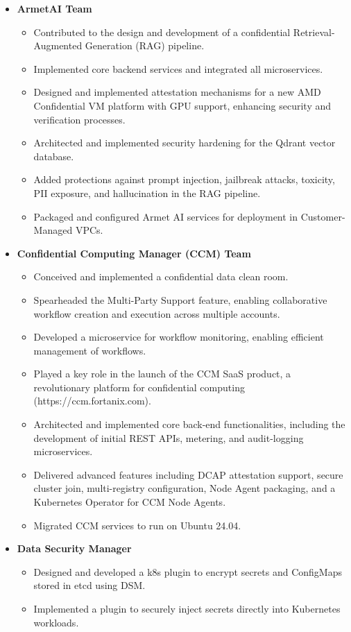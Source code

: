 \documentclass[12pt,a4paper]{article}
\begin{document}
\begin{itemize}[left=0em, label=]
\begin{itemize}[left=0.5em, label=\textbullet, leftmargin=*]
    \item  \textbf{ArmetAI Team}
    \begin{itemize}[leftmargin=*]
    \item Contributed to the design and development of a confidential Retrieval-Augmented Generation (RAG) pipeline.
    \item Implemented core backend services and integrated all microservices.
    \item Designed and implemented attestation mechanisms for a new AMD Confidential VM platform with GPU support, enhancing security and verification processes.
    \item Architected and implemented security hardening for the Qdrant vector database.
    \item Added protections against prompt injection, jailbreak attacks, toxicity, PII exposure, and hallucination in the RAG pipeline.
    \item Packaged and configured Armet AI services for deployment in Customer-Managed VPCs.
    \end{itemize}

    \item \textbf{Confidential Computing Manager (CCM) Team}
    \begin{itemize}[leftmargin=*]
    \item Conceived and implemented a confidential data clean room.
    \item Spearheaded the Multi-Party Support feature, enabling collaborative workflow creation and execution across multiple accounts.
    \item Developed a microservice for workflow monitoring, enabling efficient management of workflows.
    \item Played a key role in the launch of the CCM SaaS product, a revolutionary platform for confidential computing (https://ccm.fortanix.com).
    \item Architected and implemented core back-end functionalities, including the development of initial REST APIs, metering, and audit-logging microservices.
    \item Delivered advanced features including DCAP attestation support, secure cluster join, multi-registry configuration, Node Agent packaging, and a Kubernetes Operator for CCM Node Agents.
    \item Migrated CCM services to run on Ubuntu 24.04.
    \end{itemize}

    \item  \textbf{Data Security Manager}
    \begin{itemize}[leftmargin=*]
    \item Designed and developed a k8s plugin to encrypt secrets and ConfigMaps stored in etcd using DSM.
    \item Implemented a plugin to securely inject secrets directly into Kubernetes workloads.
    \end{itemize}
    \end{itemize}
\end{itemize}
\end{document}
